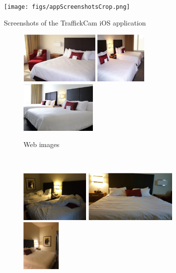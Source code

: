 \documentclass[letterpaper]{article} %
\begin{document}
\begin{figure}
\centering
    \texttt{[image: figs/appScreenshotsCrop.png]}
    \caption{Screenshots of the TraffickCam iOS application}
    \label{fig:tcamScreenshots}
\end{figure}

\begin{figure}
\centering
    \begin{subfigure}[b]{\textwidth}
    \centering
    \includegraphics[height=1in]{figures/example_images/expedia/1.png}
    \includegraphics[height=1in]{figures/example_images/expedia/2.png}
    \includegraphics[height=1in]{figures/example_images/expedia/3.png}
    \caption{Web images}
    \end{subfigure}
    \\
   \begin{subfigure}[b]{.6\textwidth}
   \centering
    \includegraphics[height=1in]{figures/example_images/tcam/1.png}
    \includegraphics[height=1in]{figures/example_images/tcam/2.png}
    \includegraphics[height=1in]{figures/example_images/tcam/3.png}

\end{subfigure}
\end{figure}
\end{document}
